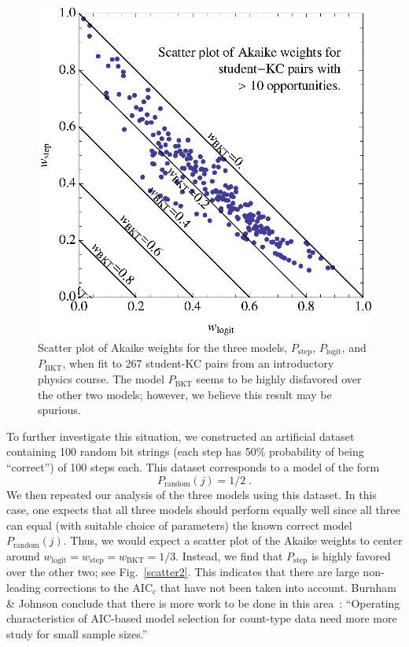 \documentclass{acmlarge-edm}
\begin{document}
\begin{figure}
  \centering \includegraphics{scatter-weights.eps}
  \caption{Scatter plot of  Akaike weights for the three models, 
   $P_\mathrm{step}$, $P_\mathrm{logit}$, and $P_\mathrm{BKT}$, 
   when fit to 267 student-KC pairs from an introductory physics course.
   The model $P_\mathrm{BKT}$ seems to be highly disfavored over
   the other two models; however, we believe this result
   may be spurious.} \label{scatter1}
\end{figure}

To further investigate this situation, we constructed an
artificial dataset containing 100 random bit strings (each
step has 50\% probability of being ``correct'') of 100 steps each.
This dataset corresponds to a model of the form
%
\begin{equation}
        P_\mathrm{random}(j)=1/2 \; .
\end{equation}
%
We then repeated our analysis of the three models using this
dataset.  In this case, one expects that all three models 
should perform equally well since all three can equal 
(with suitable choice of parameters) the known correct model 
$P_\mathrm{random}(j)$.
Thus, we would expect a scatter plot of the Akaike weights to 
center around 
$w_\mathrm{logit}=w_\mathrm{step}=w_\mathrm{BKT}=1/3$.
Instead, we find that $P_\mathrm{step}$ is highly favored over
the other two; see Fig.~\ref{scatter2}.  
This indicates that there are large non-leading
corrections to the AIC$_\mathrm{c}$ that have not been
taken into account.  Burnham \& Johnson conclude 
that there is more work to be done in this area~\cite[p.~380]{burnham_model_2002}: 
``Operating characteristics
of AIC-based model selection for count-type data need more 
more study for small sample sizes.'' 
\end{document}
